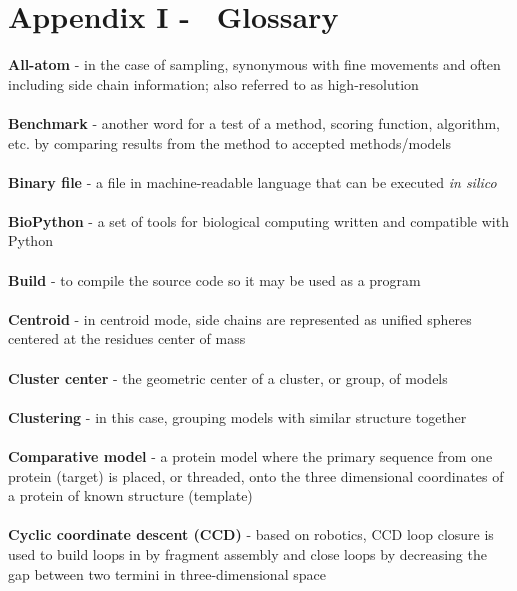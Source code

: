 \section{Appendix I - \rosetta~Glossary}
\label{sec:appI}
\singlespace
\setlength{\parindent}{0pt}

\textbf{All-atom} - in the case of sampling, synonymous with fine movements and often including side chain information; also referred to as high-resolution \\ \\

\textbf{Benchmark} - another word for a test of a method, scoring function, algorithm, etc. by comparing results from the method to accepted methods/models \\ \\

\textbf{Binary file} - a file in machine-readable language that can be executed \textit{in silico} \\ \\

\textbf{BioPython} - a set of tools for biological computing written and compatible with Python \\ \\

\textbf{Build} - to compile the source code so it may be used as a program \\ \\

\textbf{Centroid} - in \rosetta centroid mode, side chains are represented as unified spheres centered at the residues center of mass \\ \\

\textbf{Cluster center} - the geometric center of a cluster, or group, of models \\ \\

\textbf{Clustering} - in this case, grouping models with similar structure together \\ \\

\textbf{Comparative model} - a protein model where the primary sequence from one protein (target) is placed, or threaded, onto the three dimensional coordinates of a protein of known structure (template) \\ \\

\textbf{Cyclic coordinate descent (CCD)} - based on robotics, CCD loop closure is used to build loops in \rosetta by fragment assembly and close loops by decreasing the gap between two termini in three-dimensional space \\ \\

